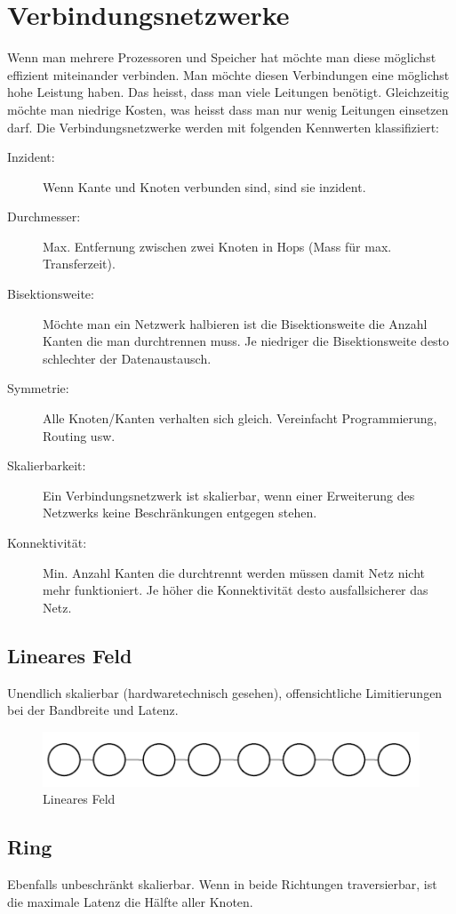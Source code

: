 \section{Verbindungsnetzwerke}
Wenn man mehrere Prozessoren und Speicher hat möchte man diese möglichst effizient miteinander verbinden. Man möchte diesen Verbindungen eine möglichst hohe Leistung haben. Das heisst, dass man viele Leitungen benötigt. Gleichzeitig möchte man niedrige Kosten, was heisst dass man nur wenig Leitungen einsetzen darf. Die Verbindungsnetzwerke werden mit folgenden Kennwerten klassifiziert:
\begin{description}
	\item[Inzident:] Wenn Kante und Knoten verbunden sind, sind sie inzident.
	\item[Durchmesser:] Max. Entfernung zwischen zwei Knoten in Hops (Mass für max. Transferzeit).
	\item[Bisektionsweite:] Möchte man ein Netzwerk halbieren ist die Bisektionsweite die Anzahl Kanten die man durchtrennen muss. Je niedriger die Bisektionsweite desto schlechter der Datenaustausch.
	\item[Symmetrie:] Alle Knoten/Kanten verhalten sich gleich. Vereinfacht Programmierung, Routing usw.
	\item[Skalierbarkeit:] Ein Verbindungsnetzwerk ist skalierbar, wenn einer Erweiterung des Netzwerks keine Beschränkungen entgegen stehen.
	\item[Konnektivität:] Min. Anzahl Kanten die durchtrennt werden müssen damit Netz nicht mehr funktioniert. Je höher die Konnektivität desto ausfallsicherer das Netz.
\end{description}

\subsection{Lineares Feld}
Unendlich skalierbar (hardwaretechnisch gesehen), offensichtliche Limitierungen bei der Bandbreite und Latenz.

\begin{figure}[h!]
	\centering
	\includegraphics[width=0.7\linewidth]{fig/lineares_feld}
	\caption{Lineares Feld}
	\label{fig:lineares_feld}
\end{figure}

\subsection{Ring}
Ebenfalls unbeschränkt skalierbar. Wenn in beide Richtungen traversierbar, ist die maximale Latenz die Hälfte aller Knoten.

